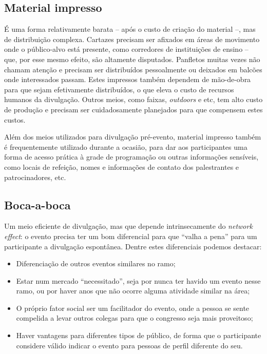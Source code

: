 \documentclass[12pt,a4paper,twoside,hyphens,english,brazil]{abntex2}
\begin{document}
\subsection*{Material impresso}
É uma forma relativamente barata -- após o custo de criação do material --, mas de distribuição complexa. Cartazes precisam ser afixados em áreas de movimento onde o público-alvo está presente, como corredores de instituições de ensino -- que, por esse mesmo efeito, são altamente disputados. Panfletos muitas vezes não chamam atenção e precisam ser distribuídos pessoalmente ou deixados em balcões onde interessados passam.  Estes impressos também dependem de mão-de-obra para que sejam efetivamente distribuídos, o que eleva o custo de recursos humanos da divulgação.
Outros meios, como faixas, \emph{outdoors} e etc, tem alto custo de produção e precisam ser cuidadosamente planejados para que compensem estes custos.

Além dos meios utilizados para divulgação pré-evento, material impresso também é frequentemente utilizado durante a ocasião, para dar aos participantes uma forma de acesso prática à grade de programação ou outras informações sensíveis, como locais de refeição, nomes e informações de contato dos palestrantes e patrocinadores, etc.

\subsection*{Boca-a-boca}
Um meio eficiente de divulgação, mas que depende intrinsecamente do \emph{network effect}: o evento precisa ter um bom diferencial para que ``valha a pena'' para um participante a divulgação espontânea. Dentre estes diferenciais podemos destacar:
\begin{itemize}
	\item Diferenciação de outros eventos similares no ramo;
	\item Estar num mercado ``necessitado'', seja por nunca ter havido um evento nesse ramo, ou por haver anos que não ocorre alguma atividade similar na área;
	\item O próprio fator social ser um facilitador do evento, onde a pessoa se sente compelida a levar outros colegas para que o congresso seja mais proveitoso;
	\item Haver vantagens para diferentes tipos de público, de forma que o participante considere válido indicar o evento para pessoas de perfil diferente do seu.
\end{itemize}
\end{document}
